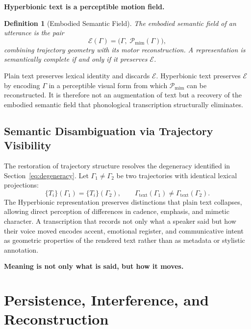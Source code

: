 \documentclass[12pt, a4paper]{article}
\newcommand{\hyperemph}[1]{\textbf{\large #1}}
\newcommand{\hyperstrong}[1]{\textbf{\Large #1}}
\newtheorem{definition}{Definition}
\begin{document}
\begin{center}
\hyperstrong{Hyperbionic text is a perceptible motion field.}
\end{center}

\begin{definition}[Embodied Semantic Field]
The embodied semantic field of an utterance is the pair
\begin{equation}
\mathcal{E}(\Gamma) = \bigl(\Gamma,\; \mathcal{P}_{\mathrm{mim}}(\Gamma)\bigr),
\label{eq:embodied}
\end{equation}
combining trajectory geometry with its motor reconstruction. A representation is semantically complete if and only if it preserves $\mathcal{E}$.
\end{definition}

Plain text preserves lexical identity and discards $\mathcal{E}$. Hyperbionic text preserves $\mathcal{E}$ by encoding $\Gamma$ in a perceptible visual form from which $\mathcal{P}_{\mathrm{mim}}$ can be reconstructed. It is therefore not an augmentation of text but a recovery of the embodied semantic field that phonological transcription structurally eliminates.

\subsection{Semantic Disambiguation via Trajectory Visibility}

The restoration of trajectory structure resolves the degeneracy identified in Section~\ref{eq:degeneracy}. Let $\Gamma_1 \neq \Gamma_2$ be two trajectories with identical lexical projections:
\begin{equation}
\{T_i\}(\Gamma_1) = \{T_i\}(\Gamma_2), \qquad \Gamma_{\mathrm{text}}(\Gamma_1) \neq \Gamma_{\mathrm{text}}(\Gamma_2).
\label{eq:disambig}
\end{equation}
The Hyperbionic representation preserves distinctions that plain text collapses, allowing direct perception of differences in cadence, emphasis, and mimetic character. A transcription that records not only what a speaker said but how their voice moved encodes accent, emotional register, and communicative intent as geometric properties of the rendered text rather than as metadata or stylistic annotation.

\begin{center}
\hyperemph{Meaning is not only what is said, but how it moves.}
\end{center}


\section{Persistence, Interference, and Reconstruction}
\end{document}
